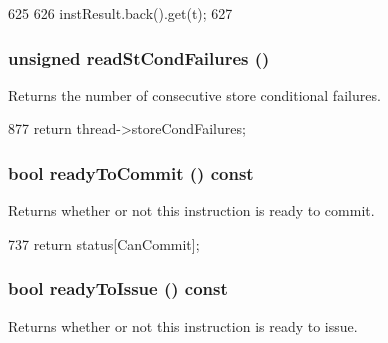 \begin{DoxyCode}
625     {
626         instResult.back().get(t);
627     }
\end{DoxyCode}
\hypertarget{classBaseDynInst_a25b995a791e41965e088d8bf3f2bf859}{
\subsubsection[{readStCondFailures}]{\setlength{\rightskip}{0pt plus 5cm}unsigned readStCondFailures ()}}
\label{classBaseDynInst_a25b995a791e41965e088d8bf3f2bf859}
Returns the number of consecutive store conditional failures. 


\begin{DoxyCode}
877     { return thread->storeCondFailures; }
\end{DoxyCode}
\hypertarget{classBaseDynInst_a0bfca6b2400cf8496f4e685668839861}{
\subsubsection[{readyToCommit}]{\setlength{\rightskip}{0pt plus 5cm}bool readyToCommit () const}}
\label{classBaseDynInst_a0bfca6b2400cf8496f4e685668839861}
Returns whether or not this instruction is ready to commit. 


\begin{DoxyCode}
737 { return status[CanCommit]; }
\end{DoxyCode}
\hypertarget{classBaseDynInst_a29fcc55658982386428d8035e438589f}{
\subsubsection[{readyToIssue}]{\setlength{\rightskip}{0pt plus 5cm}bool readyToIssue () const}}
\label{classBaseDynInst_a29fcc55658982386428d8035e438589f}
Returns whether or not this instruction is ready to issue. 



